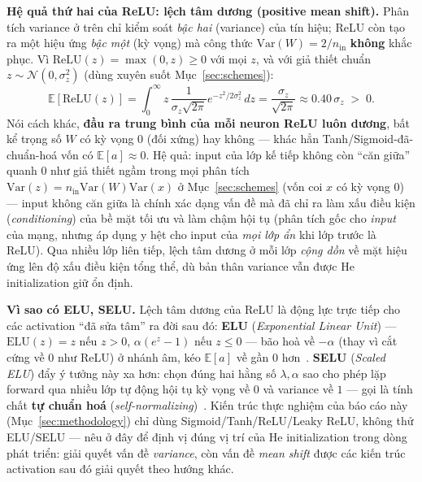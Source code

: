 \documentclass[12pt,a4paper]{report}
\newcommand{\en}[1]{\textit{#1}}
\begin{document}
\textbf{Hệ quả thứ hai của ReLU: lệch tâm dương (positive mean shift).}
Phân tích variance ở trên chỉ kiểm soát \emph{bậc hai} (variance) của tín
hiệu; ReLU còn tạo ra một hiệu ứng \emph{bậc một} (kỳ vọng) mà công thức
$\mathrm{Var}(W)=2/n_{\text{in}}$ \textbf{không} khắc phục. Vì
$\mathrm{ReLU}(z)=\max(0,z)\ge0$ với mọi $z$, và với giả thiết chuẩn
$z\sim\mathcal N(0,\sigma_z^2)$ (dùng xuyên suốt Mục~\ref{sec:schemes}):
$$\mathbb E[\mathrm{ReLU}(z)] = \int_0^\infty z\,\frac{1}{\sigma_z\sqrt{2\pi}}e^{-z^2/2\sigma_z^2}\,dz = \frac{\sigma_z}{\sqrt{2\pi}} \approx 0.40\,\sigma_z \;>\;0.$$
Nói cách khác, \textbf{đầu ra trung bình của mỗi neuron ReLU luôn dương},
bất kể trọng số $W$ có kỳ vọng $0$ (đối xứng) hay không --- khác hẳn
Tanh/Sigmoid-đã-chuẩn-hoá vốn có $\mathbb E[a]\approx0$. Hệ quả: input của
lớp kế tiếp không còn ``căn giữa'' quanh $0$ như giả thiết ngầm trong mọi
phân tích $\mathrm{Var}(z)=n_{\text{in}}\mathrm{Var}(W)\mathrm{Var}(x)$ ở
Mục~\ref{sec:schemes} (vốn coi $x$ có kỳ vọng $0$) --- input không căn
giữa là chính xác dạng vấn đề mà \citet{lecun1998efficient} đã chỉ ra làm
xấu điều kiện (\en{conditioning}) của bề mặt tối ưu và làm chậm hội tụ
(phân tích gốc cho \emph{input} của mạng, nhưng áp dụng y hệt cho input
của \emph{mọi lớp ẩn} khi lớp trước là ReLU). Qua nhiều lớp liên tiếp,
lệch tâm dương ở mỗi lớp \emph{cộng dồn} về mặt hiệu ứng lên độ xấu điều
kiện tổng thể, dù bản thân variance vẫn được He initialization giữ ổn
định.

\par\noindent\textbf{Vì sao có ELU, SELU.}\enspace 
Lệch tâm dương của ReLU là động lực trực tiếp cho các activation ``đã sửa
tâm'' ra đời sau đó: \textbf{ELU} (\en{Exponential Linear Unit})
--- $\mathrm{ELU}(z)=z$ nếu $z>0$, $\alpha(e^z-1)$ nếu $z\le0$
--- bão hoà về $-\alpha$ (thay vì cắt cứng về $0$ như ReLU) ở nhánh âm,
kéo $\mathbb E[a]$ về gần $0$ hơn~\citep{clevert2016elu}. \textbf{SELU}
(\en{Scaled ELU}) đẩy ý tưởng này xa hơn: chọn đúng hai hằng số
$\lambda,\alpha$ sao cho phép lặp forward qua nhiều lớp tự động hội tụ
kỳ vọng về $0$ và variance về $1$ --- gọi là tính chất
\textbf{tự chuẩn hoá} (\en{self-normalizing})~\citep{klambauer2017selu}.
Kiến trúc thực nghiệm của báo cáo này (Mục~\ref{sec:methodology}) chỉ
dùng Sigmoid/Tanh/ReLU/Leaky ReLU, không thử ELU/SELU --- nêu ở đây để
định vị đúng vị trí của He initialization trong dòng phát triển: giải
quyết vấn đề \emph{variance}, còn vấn đề \emph{mean shift} được các kiến
trúc activation sau đó giải quyết theo hướng khác.
\par
\end{document}
